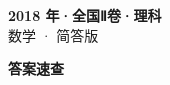 \documentclass[zihao=-4, a4paper]{ctexart}
\begin{document}
\begin{center}
  {\Large\bfseries 2018 年·全国Ⅱ卷·理科}\\[4pt]
  {\large 数学 · 简答版}
\end{center}
\medskip
{}

\clearpage
{}
\begin{center}{\Large\bfseries 答案速查}\end{center}
\medskip

\end{document}
